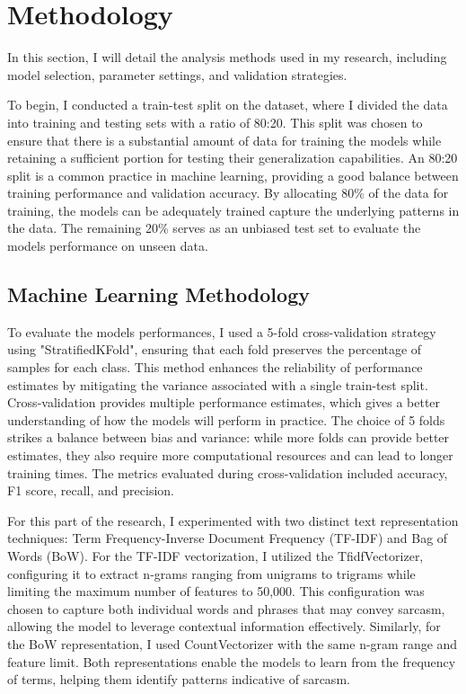 \section{Methodology}

In this section, I will detail the analysis methods used in my research, including model selection, parameter settings, and validation strategies.

To begin, I conducted a train-test split on the dataset, where I divided the data into training and testing sets with a ratio of 80:20. 
This split was chosen to ensure that there is a substantial amount of data for training the models while retaining a sufficient portion for testing their generalization capabilities. 
An 80:20 split is a common practice in machine learning, providing a good balance between training performance and validation accuracy. By allocating 80\% of the data for training, 
the models can be adequately trained capture the underlying patterns in the data. The remaining 20\% serves as an unbiased test set to evaluate the models performance on unseen data.

\subsection{Machine Learning Methodology}

To evaluate the models performances, I used a 5-fold cross-validation strategy using "StratifiedKFold", ensuring that each fold preserves the percentage of samples for each class. 
This method enhances the reliability of performance estimates by mitigating the variance associated with a single train-test split. Cross-validation provides multiple performance 
estimates, which gives a better understanding of how the models will perform in practice. The choice of 5 folds strikes a balance between bias and variance: while more folds can 
provide better estimates, they also require more computational resources and can lead to longer training times. The metrics evaluated during cross-validation included accuracy, 
F1 score, recall, and precision.

For this part of the research, I experimented with two distinct text representation techniques: Term Frequency-Inverse Document Frequency (TF-IDF) and Bag of Words (BoW). 
For the TF-IDF vectorization, I utilized the TfidfVectorizer, configuring it to extract n-grams ranging from unigrams to trigrams while limiting the maximum number of features to 50,000. 
This configuration was chosen to capture both individual words and phrases that may convey sarcasm, allowing the model to leverage contextual information effectively. 
Similarly, for the BoW representation, I used CountVectorizer with the same n-gram range and feature limit. Both representations enable the models to learn from the frequency of terms, 
helping them identify patterns indicative of sarcasm.


